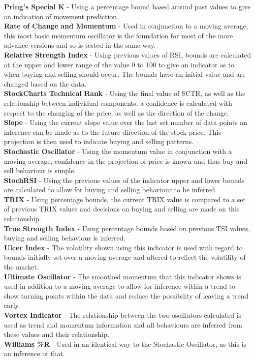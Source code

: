 \documentclass[12pt,a4paper]{article}
\begin{document}
\textbf{Pring's Special K} - Using a percentage bound based around past values to give an indication of movement prediction.\\
\textbf{Rate of Change and Momentum} - Used in conjunction to a moving average, this most basic momentum oscillator is the foundation for most of the more advance versions and so is tested in the same way.\\
\textbf{Relative Strength Index} - Using previous values of RSI, bounds are calculated at the upper and lower range of the value 0 to 100 to give an indicator as to when buying and selling should occur. The bounds have an initial value and are changed based on the data. \\
\textbf{StockCharts Technical Rank} - Using the final value of SCTR, as well as the relationship between individual components, a confidence is calculated with respect to the changing of the price, as well as the direction of the change. \\
\textbf{Slope} - Using the current slope value over the last set number of data points an inference can be made as to the future direction of the stock price. This projection is then used to indicate buying and selling patterns. \\
\textbf{Stochastic Oscillator} - Using the momentum value in conjunction with a moving average, confidence in the projection of price is known and thus buy and sell behaviour is simple. \\
\textbf{StochRSI} - Using the previous values of the indicator upper and lower bounds are calculated to allow for buying and selling behaviour to be inferred. \\
\textbf{TRIX} - Using percentage bounds, the current TRIX value is compared to a set of previous TRIX values and decisions on buying and selling are made on this relationship.\\
\textbf{True Strength Index} - Using percentage bounds based on previous TSI values, buying and selling behaviour is inferred. \\
\textbf{Ulcer Index} - The volatility shown using this indicator is used with regard to bounds initially set over a moving average and altered to reflect the volatility of the market. \\
\textbf{Ultimate Oscillator} - The smoothed momentum that this indicator shows is used in addition to a moving average to allow for inference within a trend to show turning points within the data and reduce the possibility of leaving a trend early. \\
\textbf{Vortex Indicator} - The relationship between the two oscillators calculated is used as trend and momentum information and all behaviours are inferred from these values and their relationship. \\
\textbf{Williams \%R} - Used in an identical way to the Stochastic Oscillator, as this is an inference of that. \\
\end{document}
